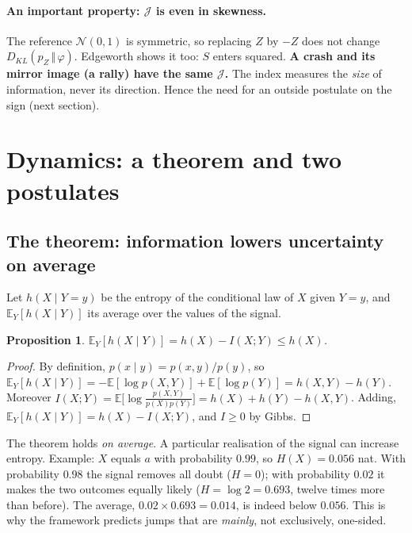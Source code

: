 \documentclass[11pt]{article}
\theoremstyle{plain}
\newtheorem{proposition}{Proposition}[section]
\theoremstyle{definition}
\theoremstyle{remark}
\newcommand{\JJ}{\mathcal{J}}
\newcommand{\E}{\mathbb{E}}
\newcommand{\N}{\mathcal{N}}
\newcommand{\KL}[2]{D_{KL}\!\left(#1\,\Vert\,#2\right)}
\begin{document}
\paragraph{An important property: $\JJ$ is even in skewness.} The reference
$\N(0,1)$ is symmetric, so replacing $Z$ by $-Z$ does not change
$\KL{p_Z}{\varphi}$. Edgeworth shows it too: $S$ enters squared. \textbf{A
crash and its mirror image (a rally) have the same $\JJ$.} The index measures
the \emph{size} of information, never its direction. Hence the need for an
outside postulate on the sign (next section).

\section{Dynamics: a theorem and two postulates}
\label{sec:dynamique}

\subsection{The theorem: information lowers uncertainty on average}

Let $h(X\mid Y=y)$ be the entropy of the conditional law of $X$ given $Y=y$,
and $\E_Y[h(X\mid Y)]$ its average over the values of the signal.

\begin{proposition}
\label{prop:cond}
$\E_Y[h(X\mid Y)]=h(X)-I(X;Y)\le h(X)$.
\end{proposition}

\begin{proof}
By definition, $p(x\mid y)=p(x,y)/p(y)$, so
$\E_Y[h(X\mid Y)]=-\E[\log p(X,Y)]+\E[\log p(Y)]=h(X,Y)-h(Y)$. Moreover
$I(X;Y)=\E\bigl[\log\tfrac{p(X,Y)}{p(X)p(Y)}\bigr]=h(X)+h(Y)-h(X,Y)$. Adding,
$\E_Y[h(X\mid Y)]=h(X)-I(X;Y)$, and $I\ge0$ by Gibbs.
\end{proof}

\begin{piege}
The theorem holds \emph{on average}. A particular realisation of the signal
can increase entropy. Example: $X$ equals $a$ with probability $0.99$, so
$H(X)=0.056$ nat. With probability $0.98$ the signal removes all doubt
($H=0$); with probability $0.02$ it makes the two outcomes equally likely
($H=\log2=0.693$, twelve times more than before). The average,
$0.02\times0.693=0.014$, is indeed below $0.056$. This is why the framework
predicts jumps that are \emph{mainly}, not exclusively, one-sided.
\end{piege}
\end{document}
